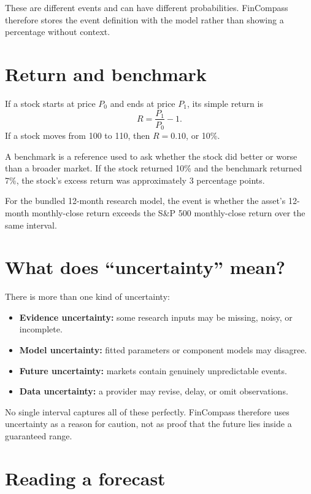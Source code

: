 \documentclass[11pt]{article}
\begin{document}
These are different events and can have different probabilities. FinCompass therefore stores the event definition with the model rather than showing a percentage without context.

\section{Return and benchmark}

If a stock starts at price $P_0$ and ends at price $P_1$, its simple return is
\begin{equation}
R=\frac{P_1}{P_0}-1.
\end{equation}
If a stock moves from 100 to 110, then $R=0.10$, or 10\%.

A benchmark is a reference used to ask whether the stock did better or worse than a broader market. If the stock returned 10\% and the benchmark returned 7\%, the stock's excess return was approximately 3 percentage points.

For the bundled 12-month research model, the event is whether the asset's 12-month monthly-close return exceeds the S\&P 500 monthly-close return over the same interval.

\section{What does ``uncertainty'' mean?}

There is more than one kind of uncertainty:

\begin{itemize}
\item \textbf{Evidence uncertainty:} some research inputs may be missing, noisy, or incomplete.
\item \textbf{Model uncertainty:} fitted parameters or component models may disagree.
\item \textbf{Future uncertainty:} markets contain genuinely unpredictable events.
\item \textbf{Data uncertainty:} a provider may revise, delay, or omit observations.
\end{itemize}

No single interval captures all of these perfectly. FinCompass therefore uses uncertainty as a reason for caution, not as proof that the future lies inside a guaranteed range.

\section{Reading a forecast}
\end{document}
